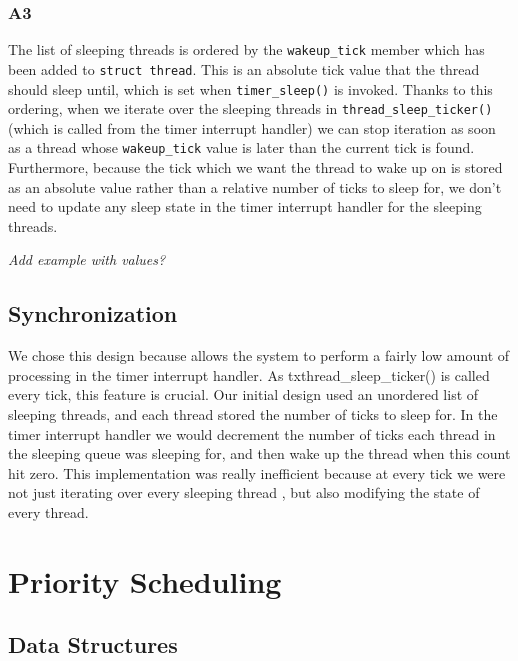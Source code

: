 \documentclass[a4wide, 11pt]{article}
\newcommand{\tx}{\texttt}
\begin{document}
\subsubsection{A3}

The list of sleeping threads is ordered by the \tx{wakeup\_tick} member
which has been added to \tx{struct thread}. This is an absolute tick value that the thread 
should sleep until, which is set when \tx{timer\_sleep()} is invoked. Thanks to this ordering, when we iterate over the sleeping threads in \tx{thread\_sleep\_ticker()} (which is called from the
timer interrupt handler) we can stop iteration as soon as a thread whose
\tx{wakeup\_tick} value is later than the current tick is found.
\\
Furthermore, because the tick which we want the thread to wake up on is stored as
an absolute value rather than a relative number of ticks to sleep for, we don't
need to update any sleep state in the timer interrupt handler for the sleeping
threads.

\emph{Add example with values?}

\subsection{Synchronization}

We chose this design because allows the system to perform a fairly low amount of processing in the
timer interrupt handler. As tx{thread\_sleep\_ticker()} is called every tick, this feature is crucial. Our
initial design used an unordered list of sleeping threads, and each thread
stored the number of ticks to sleep for. In the timer interrupt handler we
would decrement the number of ticks each thread in the sleeping queue was
sleeping for, and then wake up the thread when this count hit zero. This implementation was
really inefficient because at every tick we were not just iterating over every sleeping
thread , but also modifying the state of every thread.

\section{Priority Scheduling}
\subsection{Data Structures}
\end{document}
